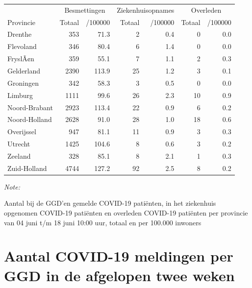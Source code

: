 \documentclass[
  english,
  man,floatsintext]{apa6}
\begin{document}
\begin{table}
\centering
\begin{threeparttable}
\begin{tabular}{lrrrrrr}
\toprule
\multicolumn{1}{c}{ } & \multicolumn{2}{c}{Besmettingen} & \multicolumn{2}{c}{Ziekenhuisopnames} & \multicolumn{2}{c}{Overleden} \\
\cmidrule(l{3pt}r{3pt}){2-3} \cmidrule(l{3pt}r{3pt}){4-5} \cmidrule(l{3pt}r{3pt}){6-7}
Provincie & Totaal & /100000 & Totaal & /100000 & Totaal & /100000\\
\midrule
Drenthe & 353 & 71.3 & 2 & 0.4 & 0 & 0.0\\
Flevoland & 346 & 80.4 & 6 & 1.4 & 0 & 0.0\\
FryslÃ¢n & 359 & 55.1 & 7 & 1.1 & 2 & 0.3\\
Gelderland & 2390 & 113.9 & 25 & 1.2 & 3 & 0.1\\
Groningen & 342 & 58.3 & 3 & 0.5 & 0 & 0.0\\
Limburg & 1111 & 99.6 & 26 & 2.3 & 10 & 0.9\\
Noord-Brabant & 2923 & 113.4 & 22 & 0.9 & 6 & 0.2\\
Noord-Holland & 2628 & 91.0 & 28 & 1.0 & 18 & 0.6\\
Overijssel & 947 & 81.1 & 11 & 0.9 & 3 & 0.3\\
Utrecht & 1425 & 104.6 & 8 & 0.6 & 3 & 0.2\\
Zeeland & 328 & 85.1 & 8 & 2.1 & 1 & 0.3\\
Zuid-Holland & 4744 & 127.2 & 92 & 2.5 & 8 & 0.2\\
\bottomrule
\end{tabular}
\begin{tablenotes}
\item \textit{Note: } 
\item Aantal bij de GGD’en gemelde COVID-19 patiënten, in het ziekenhuis opgenomen COVID-19 patiënten en overleden COVID-19 patiënten per provincie van 04 juni t/m 18 juni 10:00 uur, totaal en per 100.000 inwoners
\end{tablenotes}
\end{threeparttable}
\end{table}

\newpage

\hypertarget{aantal-covid-19-meldingen-per-ggd-in-de-afgelopen-twee-weken}{%
\section{Aantal COVID-19 meldingen per GGD in de afgelopen twee weken}\label{aantal-covid-19-meldingen-per-ggd-in-de-afgelopen-twee-weken}}
\end{document}

